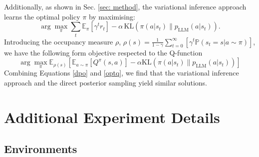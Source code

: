 Additionally, as shown in Sec. \ref{sec: method}, the variational inference approach learns the optimal policy $\pi$ by maximising:
\begin{equation}
\label{variation_appen}
\arg\max_\pi \sum_t  \mathbb{E}_\pi\left[\gamma^t r_t\right] - \alpha \, \text{KL}(\pi(a|s_t) \| p_{\text{LLM}}(a|s_t)).
\end{equation}
Introducing the occupancy measure $\rho$, $\rho(s)=\frac{1}{1-\gamma}\sum_{t=0}^\infty [\gamma^t \mathbb{P}(s_t=s|a\sim \pi)]$, we have the following form objective respected to the Q-function
\begin{equation}
\label{optq}
\arg\max_\pi \mathbb{E}_{\rho(s)}[\mathbb{E}_{a\sim\pi}[Q^\pi(s,a)]-\alpha \text{KL}(\pi(a|s_t) \| p_{\text{LLM}}(a|s_t))]
\end{equation}
Combining Equations \ref{dpo} and \ref{optq}, we find that the variational inference approach and the direct posterior sampling yield similar solutions.
\section{Additional Experiment Details}
\subsection{Environments}

